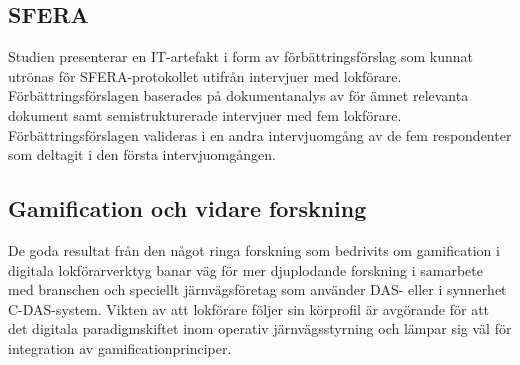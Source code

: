 \subsection{SFERA}
Studien presenterar en IT-artefakt i form av förbättringsförslag som kunnat utrönas för SFERA-protokollet utifrån intervjuer med lokförare.
Förbättringsförslagen baserades på dokumentanalys av för ämnet relevanta dokument samt semistrukturerade intervjuer med fem lokförare.
Förbättringsförslagen valideras i en andra intervjuomgång av de fem respondenter som deltagit i den första intervjuomgången.
\subsection{Gamification och vidare forskning}
De goda resultat från den något ringa forskning som bedrivits om gamification i digitala lokförarverktyg banar väg för mer djuplodande forskning i samarbete med branschen och speciellt järnvägsföretag som använder DAS- eller i synnerhet C-DAS-system.
Vikten av att lokförare följer sin körprofil är avgörande för att det digitala paradigmskiftet inom operativ järnvägsstyrning och lämpar sig väl för integration av gamificationprinciper.